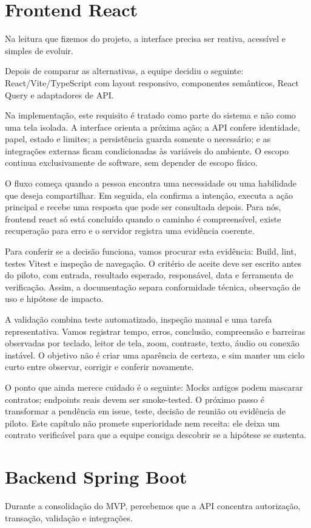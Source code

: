 \documentclass[12pt,oneside,a4paper,article]{abntex2}
\begin{document}
\section{Frontend React}
Na leitura que fizemos do projeto, a interface precisa ser reativa, acessível e simples de evoluir.

Depois de comparar as alternativas, a equipe decidiu o seguinte: React/Vite/TypeScript com layout responsivo, componentes semânticos, React Query e adaptadores de API.

Na implementação, este requisito é tratado como parte do sistema e não como uma tela isolada. A interface orienta a próxima ação; a API confere identidade, papel, estado e limites; a persistência guarda somente o necessário; e as integrações externas ficam condicionadas às variáveis do ambiente. O escopo continua exclusivamente de software, sem depender de escopo físico.

O fluxo começa quando a pessoa encontra uma necessidade ou uma habilidade que deseja compartilhar. Em seguida, ela confirma a intenção, executa a ação principal e recebe uma resposta que pode ser consultada depois. Para nós, frontend react só está concluído quando o caminho é compreensível, existe recuperação para erro e o servidor registra uma evidência coerente.

Para conferir se a decisão funciona, vamos procurar esta evidência: Build, lint, testes Vitest e inspeção de navegação. O critério de aceite deve ser escrito antes do piloto, com entrada, resultado esperado, responsável, data e ferramenta de verificação. Assim, a documentação separa conformidade técnica, observação de uso e hipótese de impacto.

A validação combina teste automatizado, inspeção manual e uma tarefa representativa. Vamos registrar tempo, erros, conclusão, compreensão e barreiras observadas por teclado, leitor de tela, zoom, contraste, texto, áudio ou conexão instável. O objetivo não é criar uma aparência de certeza, e sim manter um ciclo curto entre observar, corrigir e conferir novamente.

O ponto que ainda merece cuidado é o seguinte: Mocks antigos podem mascarar contratos; endpoints reais devem ser smoke-tested. O próximo passo é transformar a pendência em issue, teste, decisão de reunião ou evidência de piloto. Este capítulo não promete superioridade nem receita: ele deixa um contrato verificável para que a equipe consiga descobrir se a hipótese se sustenta.

\section{Backend Spring Boot}
Durante a consolidação do MVP, percebemos que a API concentra autorização, transação, validação e integrações.
\end{document}
